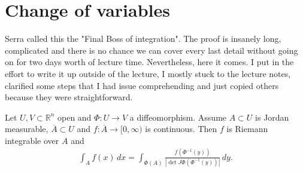 \section{Change of variables}

Serra called this the "Final Boss of integration". The proof is insanely long, complicated and there is no chance we can cover every last detail without going on for two days worth of lecture time. Nevertheless, here it comes. I put in the effort to write it up outside of the lecture, I mostly stuck to the lecture notes, clarified some steps that I had issue comprehending and just copied others because they were straightforward.

\begin{theorem}\label{thm:change-of-vars}
	Let $U,V \subset \mathbb{R}^{n}$ open and $\Phi: U \to V$ a diffeomorphism. Assume $A \subset U$ is Jordan measurable, $\overline{ A } \subset U$ and $f: \overline{ A }  \to [0,\infty)$ is continuous. Then $f$ is Riemann integrable over $A$ and
	\begin{align*}
		\int_{A} f(x) \, dx = \int_{\Phi(A)} \frac{f(\Phi^{-1}(y))}{\left| \det J \Phi(\Phi^{-1}(y)) \right|} \, dy.
	\end{align*}
\end{theorem}
